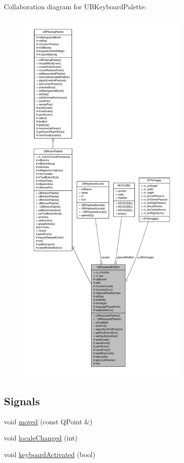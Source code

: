 Collaboration diagram for U\-B\-Keyboard\-Palette\-:
\nopagebreak
\begin{figure}[H]
\begin{center}
\leavevmode
\includegraphics[height=550pt]{d6/d1e/class_u_b_keyboard_palette__coll__graph}
\end{center}
\end{figure}
\subsection*{Signals}
\begin{DoxyCompactItemize}
\item 
void \hyperlink{class_u_b_keyboard_palette_abc5328ca16e99915385f5164e89ec954}{moved} (const Q\-Point \&)
\item 
void \hyperlink{class_u_b_keyboard_palette_a7000e039c9e39812a9eb87aac2c561bb}{locale\-Changed} (int)
\item 
void \hyperlink{class_u_b_keyboard_palette_affd87073e137b50f661e97d74ba7f1a5}{keyboard\-Activated} (bool)
\end{DoxyCompactItemize}
